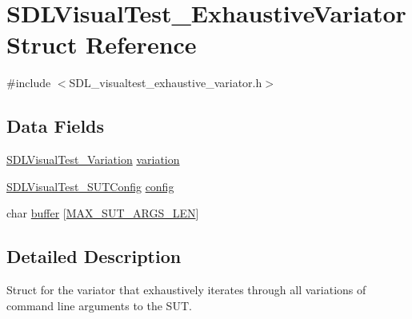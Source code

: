 \hypertarget{struct_s_d_l_visual_test___exhaustive_variator}{\section{S\-D\-L\-Visual\-Test\-\_\-\-Exhaustive\-Variator Struct Reference}
\label{struct_s_d_l_visual_test___exhaustive_variator}
}


{\ttfamily \#include $<$S\-D\-L\-\_\-visualtest\-\_\-exhaustive\-\_\-variator.\-h$>$}

\subsection*{Data Fields}
\begin{DoxyCompactItemize}
\item 
\hyperlink{struct_s_d_l_visual_test___variation}{S\-D\-L\-Visual\-Test\-\_\-\-Variation} \hyperlink{struct_s_d_l_visual_test___exhaustive_variator_a11c2995cf19b41c4a1b1f8d9b4081ff7}{variation}
\item 
\hyperlink{struct_s_d_l_visual_test___s_u_t_config}{S\-D\-L\-Visual\-Test\-\_\-\-S\-U\-T\-Config} \hyperlink{struct_s_d_l_visual_test___exhaustive_variator_ab66b4220589b2e2b6e1fde7d6c20bd72}{config}
\item 
char \hyperlink{struct_s_d_l_visual_test___exhaustive_variator_a2b599af5b00be0f525ffc18feb0775a8}{buffer} \mbox{[}\hyperlink{_s_d_l__visualtest__harness__argparser_8h_a8485cbda108eca56406d67aaa685fcc5}{M\-A\-X\-\_\-\-S\-U\-T\-\_\-\-A\-R\-G\-S\-\_\-\-L\-E\-N}\mbox{]}
\end{DoxyCompactItemize}


\subsection{Detailed Description}
Struct for the variator that exhaustively iterates through all variations of command line arguments to the S\-U\-T. 

